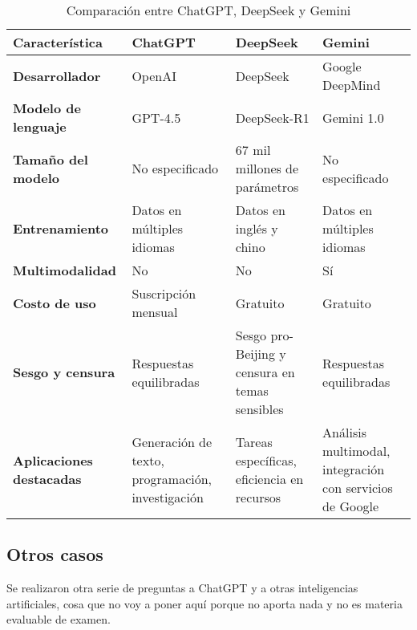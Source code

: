 \begin{table}[H]
    \centering
    \renewcommand{\arraystretch}{1.3}
    \begin{tabular}{|l|p{3cm}|p{3cm}|p{3cm}|}
        \hline
        \textbf{Característica} & \textbf{ChatGPT} & \textbf{DeepSeek} & \textbf{Gemini} \\
        \hline
        \textbf{Desarrollador} & OpenAI & DeepSeek & Google DeepMind \\
        \hline
        \textbf{Modelo de lenguaje} & GPT-4.5 & DeepSeek-R1 & Gemini 1.0 \\
        \hline
        \textbf{Tamaño del modelo} & No especificado & 67 mil millones de parámetros & No especificado \\
        \hline
        \textbf{Entrenamiento} & Datos en múltiples idiomas & Datos en inglés y chino & Datos en múltiples idiomas \\
        \hline
        \textbf{Multimodalidad} & No & No & Sí \\
        \hline
        \textbf{Costo de uso} & Suscripción mensual & Gratuito & Gratuito \\
        \hline
        \textbf{Sesgo y censura} & Respuestas equilibradas & Sesgo pro-Beijing y censura en temas sensibles & Respuestas equilibradas \\
        \hline
        \textbf{Aplicaciones destacadas} & Generación de texto, programación, investigación & Tareas específicas, eficiencia en recursos & Análisis multimodal, integración con servicios de Google \\
        \hline
    \end{tabular}
    \caption{Comparación entre ChatGPT, DeepSeek y Gemini}
    \label{tab:comparacion_modelos}
\end{table}

\subsection{Otros casos}

Se realizaron otra serie de preguntas a ChatGPT y a otras inteligencias artificiales, cosa que no voy a poner aquí porque no aporta nada y no es materia evaluable de examen.
